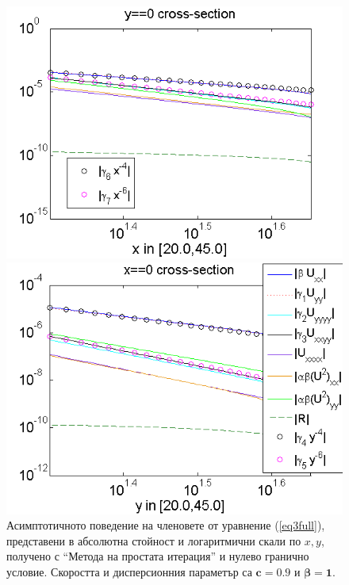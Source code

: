 \documentclass{article}
\newcommand{\rf}[1]{(\ref{#1})}
\begin{document}
\begin{figure}[ht]	
	\begin{minipage}[b]{0.95\linewidth}
		\raggedleft
		\includegraphics[width=\linewidth]{AssymptForEachTerm/bt1_c010_090/ChristovIC_AlongX_50_ZB2_bt1_c090_h020_O(h^6).png}
	\end{minipage}
	\begin{minipage}[b]{0.95\linewidth}
		 \raggedright
		\includegraphics[width=\linewidth]{AssymptForEachTerm/bt1_c010_090/ChristovIC_AlongY_50_ZB2_bt1_c090_h020_O(h^6).png}
	\end{minipage}
	\caption{Асимптотичното поведение на членовете от уравнение \rf{eq3full}, представени в абсолютна стойност и логаритмични скали по $x,y$, получено с ``Метода на простата итерация'' и нулево гранично условие. Скоростта и дисперсионния параметър са $\boldsymbol{c=0.9}$ и $\boldsymbol{\beta = 1}$. }
	\label{fig:assympt_beta1c09}
\end{figure}
\FloatBarrier
\end{document}

